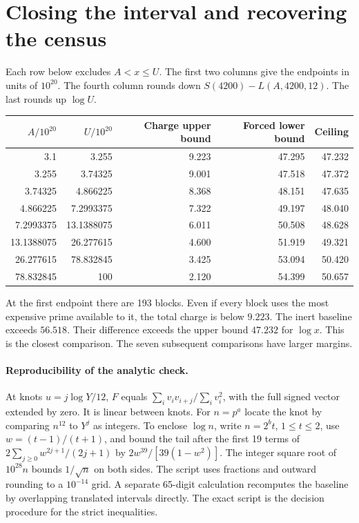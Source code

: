 \documentclass[11pt]{article}
\begin{document}
\section{Closing the interval and recovering the census}
Each row below excludes $A<x\le U$. The first two columns give the
endpoints in units of $10^{20}$. The fourth column rounds down
$S(4200)-L(A,4200,12)$. The last rounds up $\log U$.
\begin{center}
\begin{tabular}{rrrrr}\toprule
$A/10^{20}$ & $U/10^{20}$ & Charge upper bound & Forced lower bound & Ceiling\\\midrule
3.1&3.255&9.223&47.295&47.232\\
3.255&3.74325&9.001&47.518&47.372\\
3.74325&4.866225&8.368&48.151&47.635\\
4.866225&7.2993375&7.322&49.197&48.040\\
7.2993375&13.1388075&6.011&50.508&48.628\\
13.1388075&26.277615&4.600&51.919&49.321\\
26.277615&78.832845&3.425&53.094&50.420\\
78.832845&100&2.120&54.399&50.657\\\bottomrule
\end{tabular}
\end{center}
At the first endpoint there are 193 blocks. Even if every block uses
the most expensive prime available to it, the total charge is below
$9.223$. The inert baseline exceeds $56.518$. Their difference exceeds
the upper bound $47.232$ for $\log x$. This is the closest comparison.
The seven subsequent comparisons have larger margins.

\paragraph{Reproducibility of the analytic check.}
At knots $u=j\log Y/12$, $F$ equals
$\sum_i v_i v_{i+j}/\sum_i v_i^2$, with the full signed vector extended
by zero. It is linear between knots. For $n=p^a$ locate the knot by
comparing $n^{12}$ to $Y^j$ as integers. To enclose $\log n$, write
$n=2^b t$, $1\le t\le2$, use $w=(t-1)/(t+1)$, and bound the tail after
the first 19 terms of $2\sum_{j\ge0}w^{2j+1}/(2j+1)$ by
$2w^{39}/[39(1-w^2)]$. The integer square root of $10^{28}n$ bounds
$1/\sqrt n$ on both sides. The script uses fractions and outward rounding
to a $10^{-14}$ grid. A separate 65-digit calculation recomputes the
baseline by overlapping translated intervals directly. The exact script
is the decision procedure for the strict inequalities.
\end{document}
